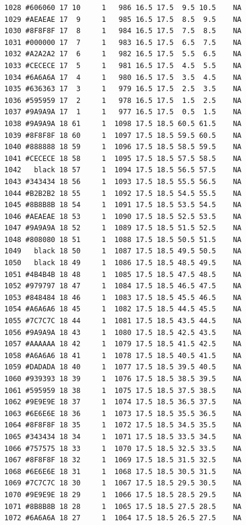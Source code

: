 \documentclass[12pt,twoside]{reedthesis}
\begin{document}
\begin{verbatim}
  1028 #606060 17 10     1   986 16.5 17.5  9.5 10.5    NA
  1029 #AEAEAE 17  9     1   985 16.5 17.5  8.5  9.5    NA
  1030 #8F8F8F 17  8     1   984 16.5 17.5  7.5  8.5    NA
  1031 #000000 17  7     1   983 16.5 17.5  6.5  7.5    NA
  1032 #A2A2A2 17  6     1   982 16.5 17.5  5.5  6.5    NA
  1033 #CECECE 17  5     1   981 16.5 17.5  4.5  5.5    NA
  1034 #6A6A6A 17  4     1   980 16.5 17.5  3.5  4.5    NA
  1035 #636363 17  3     1   979 16.5 17.5  2.5  3.5    NA
  1036 #595959 17  2     1   978 16.5 17.5  1.5  2.5    NA
  1037 #9A9A9A 17  1     1   977 16.5 17.5  0.5  1.5    NA
  1038 #9A9A9A 18 61     1  1098 17.5 18.5 60.5 61.5    NA
  1039 #8F8F8F 18 60     1  1097 17.5 18.5 59.5 60.5    NA
  1040 #888888 18 59     1  1096 17.5 18.5 58.5 59.5    NA
  1041 #CECECE 18 58     1  1095 17.5 18.5 57.5 58.5    NA
  1042   black 18 57     1  1094 17.5 18.5 56.5 57.5    NA
  1043 #343434 18 56     1  1093 17.5 18.5 55.5 56.5    NA
  1044 #B2B2B2 18 55     1  1092 17.5 18.5 54.5 55.5    NA
  1045 #8B8B8B 18 54     1  1091 17.5 18.5 53.5 54.5    NA
  1046 #AEAEAE 18 53     1  1090 17.5 18.5 52.5 53.5    NA
  1047 #9A9A9A 18 52     1  1089 17.5 18.5 51.5 52.5    NA
  1048 #808080 18 51     1  1088 17.5 18.5 50.5 51.5    NA
  1049   black 18 50     1  1087 17.5 18.5 49.5 50.5    NA
  1050   black 18 49     1  1086 17.5 18.5 48.5 49.5    NA
  1051 #4B4B4B 18 48     1  1085 17.5 18.5 47.5 48.5    NA
  1052 #979797 18 47     1  1084 17.5 18.5 46.5 47.5    NA
  1053 #848484 18 46     1  1083 17.5 18.5 45.5 46.5    NA
  1054 #A6A6A6 18 45     1  1082 17.5 18.5 44.5 45.5    NA
  1055 #7C7C7C 18 44     1  1081 17.5 18.5 43.5 44.5    NA
  1056 #9A9A9A 18 43     1  1080 17.5 18.5 42.5 43.5    NA
  1057 #AAAAAA 18 42     1  1079 17.5 18.5 41.5 42.5    NA
  1058 #A6A6A6 18 41     1  1078 17.5 18.5 40.5 41.5    NA
  1059 #DADADA 18 40     1  1077 17.5 18.5 39.5 40.5    NA
  1060 #939393 18 39     1  1076 17.5 18.5 38.5 39.5    NA
  1061 #595959 18 38     1  1075 17.5 18.5 37.5 38.5    NA
  1062 #9E9E9E 18 37     1  1074 17.5 18.5 36.5 37.5    NA
  1063 #6E6E6E 18 36     1  1073 17.5 18.5 35.5 36.5    NA
  1064 #8F8F8F 18 35     1  1072 17.5 18.5 34.5 35.5    NA
  1065 #343434 18 34     1  1071 17.5 18.5 33.5 34.5    NA
  1066 #757575 18 33     1  1070 17.5 18.5 32.5 33.5    NA
  1067 #8F8F8F 18 32     1  1069 17.5 18.5 31.5 32.5    NA
  1068 #6E6E6E 18 31     1  1068 17.5 18.5 30.5 31.5    NA
  1069 #7C7C7C 18 30     1  1067 17.5 18.5 29.5 30.5    NA
  1070 #9E9E9E 18 29     1  1066 17.5 18.5 28.5 29.5    NA
  1071 #8B8B8B 18 28     1  1065 17.5 18.5 27.5 28.5    NA
  1072 #6A6A6A 18 27     1  1064 17.5 18.5 26.5 27.5    NA

\end{verbatim}
\end{document}
